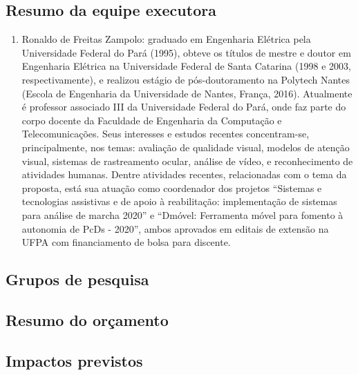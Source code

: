 \subsection{Resumo da equipe executora}
\label{ssec:equipe}
\begin{enumerate}
\item Ronaldo de Freitas Zampolo: graduado em Engenharia Elétrica pela Universidade Federal do Pará (1995), obteve os títulos de mestre e doutor em Engenharia Elétrica na Universidade Federal de Santa Catarina (1998 e 2003, respectivamente), e realizou estágio de pós-doutoramento na Polytech Nantes (Escola de Engenharia da Universidade de Nantes, França, 2016). Atualmente é professor associado III da Universidade Federal do Pará, onde faz parte do corpo docente da Faculdade de Engenharia da Computação e Telecomunicações. Seus interesses e estudos recentes concentram-se, principalmente, nos temas: avaliação de qualidade visual, modelos de atenção visual, sistemas de rastreamento ocular, análise de vídeo, e reconhecimento de atividades humanas. Dentre atividades recentes, relacionadas com o tema da proposta, está sua atuação como coordenador dos projetos ``Sistemas e tecnologias assistivas e de apoio à reabilitação: implementação de sistemas para análise de marcha  2020'' e ``Dmóvel: Ferramenta móvel para fomento à autonomia de PcDs - 2020'', ambos aprovados em editais de extensão na UFPA com financiamento de bolsa para discente.

\end{enumerate}

\subsection{Grupos de pesquisa}
\label{ssec:grppesq}


\subsection{Resumo do orçamento}
\label{ssec:orca}

\subsection{Impactos previstos}
\label{ssec:impact}

